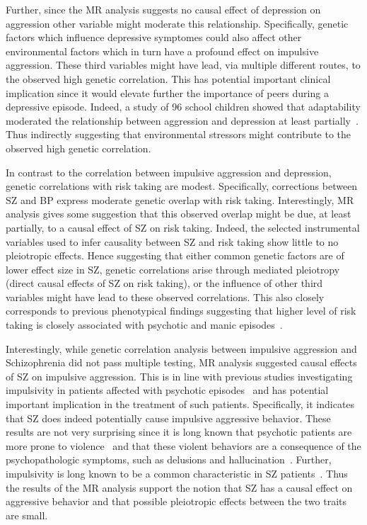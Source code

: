 Further, since the MR analysis suggests no causal effect of depression on aggression other variable might moderate this relationship.
Specifically, genetic factors which influence depressive symptomes could also affect other environmental factors which in turn have a profound effect on impulsive aggression.
These third variables might have lead, via multiple different routes, to the observed high genetic correlation.
This has potential important clinical implication since it would elevate further the importance of peers during a depressive episode.
Indeed, a study of 96 school children showed that adaptability moderated the relationship between aggression and depression at least partially~\cite{Lee2015a}.  
Thus indirectly suggesting that environmental stressors might contribute to the observed high genetic correlation. 

In contrast to the correlation between impulsive aggression and depression, genetic correlations with risk taking are modest.
Specifically, corrections between SZ and BP express moderate genetic overlap with risk taking.
Interestingly, MR analysis gives some suggestion that this observed overlap might be due, at least partially, to a causal effect of SZ on risk taking.
Indeed, the selected instrumental variables used to infer causality between SZ and risk taking show little to no pleiotropic effects.
Hence suggesting that either common genetic factors are of lower effect size in SZ, genetic correlations arise through mediated pleiotropy (direct causal effects of SZ on risk taking), or the influence of other third variables might have lead to these observed correlations. 
This also closely corresponds to previous phenotypical findings suggesting that higher level of risk taking is closely associated with psychotic and manic episodes~\cite{Johnson2012,APA1994,AmericanPsychiatricAssociation2013}.

Interestingly, while genetic correlation analysis between impulsive aggression and Schizophrenia did not pass multiple testing, MR analysis suggested causal effects of SZ on impulsive aggression. 
This is in line with previous studies investigating impulsivity in patients affected with psychotic episodes~\cite{Ouzir2013} and has potential important implication in the treatment of such patients.
Specifically, it indicates that SZ does indeed potentially cause impulsive aggressive behavior.
These results are not very surprising since it is long known that psychotic patients are more prone to violence~\cite{Douglas2009} and that these violent behaviors are a consequence of the psychopathologic symptoms, such as delusions and hallucination~\cite{Swanson2006}.
Further, impulsivity is long known to be a common characteristic in SZ patients~\citet{Ouzir2013}.
Thus the results of the MR analysis support the notion that SZ has a causal effect on aggressive behavior and that possible pleiotropic effects between the two traits are small.



